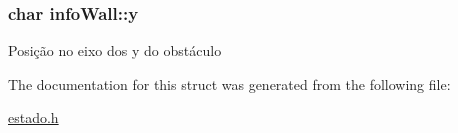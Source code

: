 \subsubsection[{\texorpdfstring{y}{y}}]{\setlength{\rightskip}{0pt plus 5cm}char info\+Wall\+::y}\hypertarget{structinfoWall_ab6a0a98ec8849197d2d5e191e84a9303}{}\label{structinfoWall_ab6a0a98ec8849197d2d5e191e84a9303}
Posição no eixo dos y do obstáculo 

The documentation for this struct was generated from the following file\+:\begin{DoxyCompactItemize}
\item 
\hyperlink{estado_8h}{estado.\+h}\end{DoxyCompactItemize}
